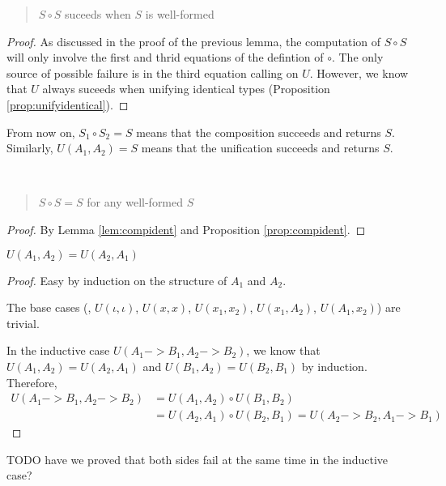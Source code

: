 \begin{proposition}
	\label{prop:compident}
\begin{quote} $S \circ S$ suceeds when $S$ is well-formed \end{quote}
\end{proposition}
\begin{proof}
As discussed in the proof of the previous lemma,
the computation of $S \circ S$ will only involve
the first and thrid equations of the defintion of $\circ$.
The only source of possible failure is in the third equation calling on $U$.
However, we know that $U$ always suceeds when unifying identical types
(Proposition \ref{prop:unifyidentical}).
\end{proof}

From now on, $S_1 \circ S_2 = S$ means that the composition succeeds and
returns $S$. Similarly, $U(A_1,A_2)=S$ means that the unification succeeds
and returns $S$.

\begin{theorem} ~
	\begin{quote} $S\circ S = S$ for any well-formed $S$ \end{quote}
\end{theorem}
\begin{proof}
	By Lemma \ref{lem:compident} and Proposition \ref{prop:compident}.
\end{proof}

\begin{theorem} $ U(A_1,A_2) = U(A_2,A_1) $
	\label{thm:commU}
\end{theorem}
\begin{proof} Easy by induction on the structure of $A_1$ and $A_2$.

The base cases (\ie, $U(\iota,\iota)$, $U(x,x)$, $U(x_1,x_2)$,
			$U(x_1,A_2)$, $U(A_1,x_2)$) are trivial.

In the inductive case $U(A_1 -> B_1, A_2 -> B_2)$, we know that
$U(A_1,A_2) = U(A_2,A_1)$ and $U(B_1,A_2) = U(B_2,B_1)$ by induction.
Therefore,
\begin{align*}
U(A_1 -> B_1, A_2 -> B_2)
	&= U(A_1,A_2) \circ U(B_1,B_2) \\
	&= U(A_2,A_1) \circ U(B_2,B_1) = U(A_2 -> B_2, A_1 -> B_1)
\end{align*}
\end{proof}
TODO have we proved that both sides fail at the same time in the inductive case?



